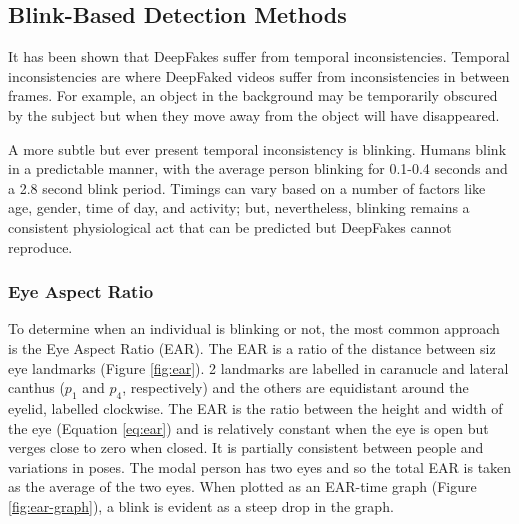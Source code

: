 \subsection{Blink-Based Detection Methods}


It has been shown that DeepFakes suffer from temporal inconsistencies\cite{juefei2022countering}. Temporal inconsistencies are where DeepFaked videos suffer from inconsistencies in between frames. For example, an object in the background may be temporarily obscured by the subject but when they move away from the object will have disappeared. 

A more subtle but ever present temporal inconsistency is blinking. Humans blink in a predictable manner, with the average person blinking for 0.1-0.4 seconds and a 2.8 second blink period\cite{schiffman1990sensation}. Timings can vary based on a number of factors like age, gender, time of day, and activity\cite{jung2020deepvision}; but, nevertheless, blinking remains a consistent physiological act that can be predicted but DeepFakes cannot reproduce.

\subsubsection{Eye Aspect Ratio}

To determine when an individual is blinking or not, the most common approach is the Eye Aspect Ratio (EAR)\cite{soukupova2016eye}. The EAR is a ratio of the distance between siz eye landmarks (Figure \ref{fig:ear}). 2 landmarks are labelled in caranucle and lateral canthus ($p_1$ and $p_4$, respectively) and the others are equidistant around the eyelid, labelled clockwise. The EAR is the ratio between the height and width of the eye (Equation \ref{eq:ear}) and is relatively constant when the eye is open but verges close to zero when closed. It is partially consistent between people and variations in poses. The modal person has two eyes and so the total EAR is taken as the average of the two eyes. When plotted as an EAR-time graph (Figure \ref{fig:ear-graph}), a blink is evident as a steep drop in the graph. 

